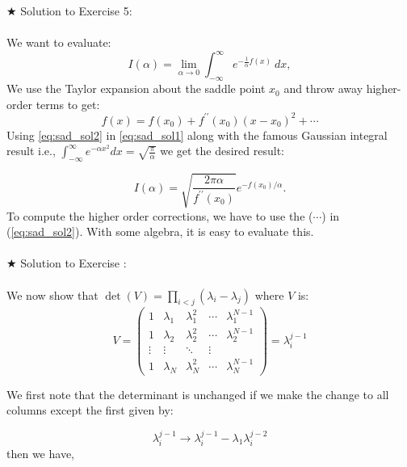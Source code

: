 \documentclass[11pt]{article}
\begin{document}
$\bigstar$ Solution to Exercise 5:
\\ \\ 
We want to evaluate: 
\begin{equation}
	\label{eq:sad_sol1} 
	I(\alpha) = \lim_{\alpha \to 0} \int_{-\infty}^{\infty} e^{-\frac{1}{\alpha}f(x)} ~dx, 
\end{equation}
We use the Taylor expansion about the saddle point $x_{0}$ and throw away higher-order terms to get:
\begin{equation}
	\label{eq:sad_sol2}
	f(x) = f(x_{0}) + f^{\prime\prime}(x_{0}) (x-x_0)^{2} + \cdots 
\end{equation}
Using \ref{eq:sad_sol2} in \ref{eq:sad_sol1} along with the famous Gaussian integral result i.e.,  $\int_{-\infty}^{\infty} e^{-\alpha x^2} dx = \sqrt{\frac{\pi}{\alpha}}$ we get the desired result:

\begin{equation}
	\label{eq:sad_sol1} 
	I(\alpha) =  \sqrt{\frac{2\pi \alpha}{f^{\prime\prime}(x_{0})}} e^{-f(x_{0})/\alpha}. 
\end{equation}
To compute the higher order corrections, we have to use the ($\cdots$) in (\ref{eq:sad_sol2}). With some algebra, it is easy to evaluate this. \\ \\ 
\noindent $\bigstar$ Solution to Exercise :
\\ \\ 
We now show that $\det(V) = \prod_{i<j} (\lambda_i - \lambda_j)$ where $V$ is: 
\begin{equation*}
	V = 
	\begin{pmatrix}
		1 & \lambda_1 & \lambda_{1}^{2} & \cdots & \lambda_{1}^{N-1} \\
		1 & \lambda_2 & \lambda_{2}^{2} & \cdots & \lambda_{2}^{N-1} \\ 
		\vdots  & \vdots  & \ddots & \vdots  \\
		1 & \lambda_N & \lambda_{N}^{2} & \cdots & \lambda_{N}^{N-1} 
	\end{pmatrix} = \lambda_{i}^{j-1} 
\end{equation*}

We first note that the determinant is unchanged
if we make the change to all columns except the first given by:

\begin{equation}
	\lambda_{i}^{j-1} \to \lambda_{i}^{j-1} - \lambda_{1} \lambda_{i}^{j-2}
\end{equation}
then we have, 
\end{document}
